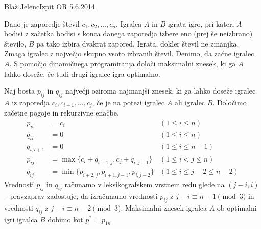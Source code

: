 \begin{naloga}{Blaž Jelenc}{Izpit OR 5.6.2014}
\begin{vprasanje}
Dano je zaporedje števil $c_1, c_2, \dots, c_n$.
Igralca $A$ in $B$ igrata igro,
pri kateri $A$ bodisi z začetka bodisi s konca danega zaporedja
izbere eno (prej še neizbrano) število,
$B$ pa tako izbira dvakrat zapored.
Igrata, dokler števil ne zmanjka.
Zmaga igralec z največjo skupno vsoto izbranih števil.
Denimo, da začne igralec $A$.
S pomočjo dinamičnega programiranja določi maksimalni znesek,
ki ga $A$ lahko doseže, če tudi drugi igralec igra optimalno.
\end{vprasanje}

\begin{odgovor}
Naj bosta $p_{ij}$ in $q_{ij}$ največji oziroma najmanjši znesek,
ki ga lahko doseže igralec $A$ iz zaporedja $c_i, c_{i+1}, \dots, c_j$,
če je na potezi igralec $A$ ali igralec $B$.
Določimo začetne pogoje in rekurzivne enačbe.
\begin{align*}
p_{ii} &= c_i & (1 \le i \le n) \\
q_{ii} &= 0 & (1 \le i \le n) \\
q_{i,i+1} &= 0 & (1 \le i \le n-1) \\
p_{ij} &= \max\{c_i + q_{i+1,j}, c_j + q_{i,j-1}\} & (1 \le i < j \le n) \\
q_{ij} &= \min\{p_{i+2,j}, p_{i+1,j-1}, p_{i,j-2}\} & (1 \le i \le j-2 \le n-2)
\end{align*}
Vrednosti $p_{ij}$ in $q_{ij}$ računamo
v leksikografskem vrstnem redu glede na $(j-i, i)$
-- pravzaprav zadostuje,
da izračunamo vrednosti $p_{ij}$ z $j-i \equiv n-1 \pmod{3}$
in vrednosti $q_{ij}$ z $j-i \equiv n-2 \pmod{3}$.
Maksimalni znesek igralca $A$ ob optimalni igri igralca $B$
dobimo kot $p^* = p_{1n}$.
\end{odgovor}
\end{naloga}
